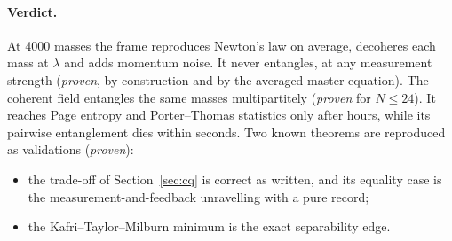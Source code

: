 \paragraph{Verdict.} At 4000 masses the frame reproduces Newton's law on average, decoheres each mass at $\lambda$ and adds momentum noise.
It never entangles, at any measurement strength (\emph{proven}, by construction and by the averaged master equation). The coherent field
entangles the same masses multipartitely (\emph{proven} for $N\le24$). It reaches Page entropy and Porter--Thomas statistics only after hours,
while its pairwise entanglement dies within seconds. Two known theorems are reproduced as validations (\emph{proven}):
\begin{itemize}[nosep]
\item the trade-off of Section~\ref{sec:cq} is correct as written, and its equality case is the measurement-and-feedback unravelling with a
pure record;
\item the Kafri--Taylor--Milburn minimum is the exact separability edge.
\end{itemize}
